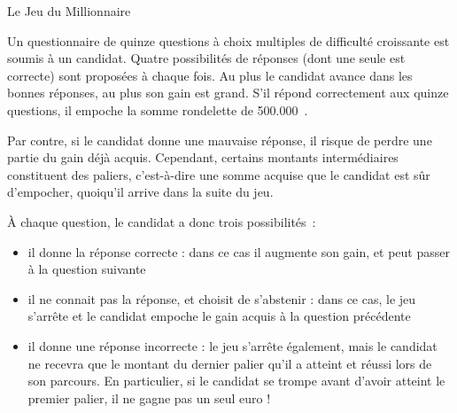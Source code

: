 \begin{Exercice}{Le Jeu du Millionnaire}

	Un questionnaire de quinze questions à choix
	multiples de difficulté croissante est soumis à un candidat. Quatre
	possibilités de réponses (dont une seule est correcte) sont proposées à
	chaque fois. Au plus le candidat avance dans les bonnes réponses, au
	plus son gain est grand. S’il répond correctement aux quinze questions,
	il empoche la somme rondelette de 500.000~\texteuro.
	
	Par contre, si le candidat donne une mauvaise
	réponse, il risque de perdre une partie du gain déjà acquis. Cependant,
	certains montants intermédiaires constituent des paliers, c’est-à-dire
	une somme acquise que le candidat est sûr d’empocher, quoiqu’il arrive
	dans la suite du jeu.

	À chaque question, le candidat a donc trois
	possibilités~:
	\begin{itemize}
		\item 
			il donne la réponse correcte : dans ce cas il
			augmente son gain, et peut passer à la question suivante
		\item 
			il ne connait pas la réponse, et choisit de
			s’abstenir : dans ce cas, le jeu s’arrête et le candidat empoche le
			gain acquis à la question précédente
		\item 
			il donne une réponse incorrecte : le jeu
			s’arrête également, mais le candidat ne recevra que le montant du
			dernier palier qu’il a atteint et réussi lors de son parcours. En
			particulier, si le candidat se trompe avant d’avoir atteint le premier
			palier, il ne gagne pas un seul euro !
	\end{itemize}
	

\end{Exercice}
